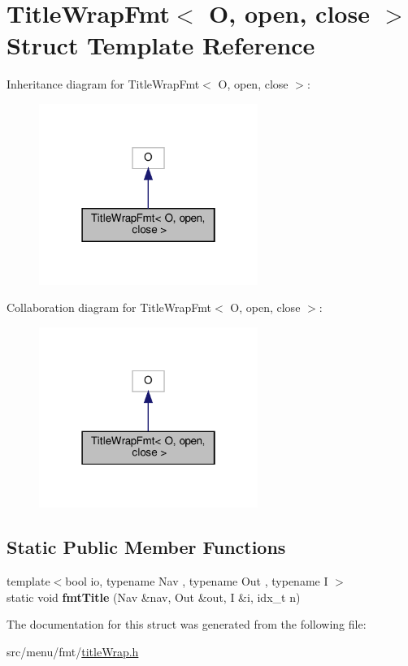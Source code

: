 \hypertarget{structTitleWrapFmt}{}\section{Title\+Wrap\+Fmt$<$ O, open, close $>$ Struct Template Reference}
\label{structTitleWrapFmt}


Inheritance diagram for Title\+Wrap\+Fmt$<$ O, open, close $>$\+:\nopagebreak
\begin{figure}[H]
\begin{center}
\leavevmode
\includegraphics[width=202pt]{structTitleWrapFmt__inherit__graph}
\end{center}
\end{figure}


Collaboration diagram for Title\+Wrap\+Fmt$<$ O, open, close $>$\+:\nopagebreak
\begin{figure}[H]
\begin{center}
\leavevmode
\includegraphics[width=202pt]{structTitleWrapFmt__coll__graph}
\end{center}
\end{figure}
\subsection*{Static Public Member Functions}
\begin{DoxyCompactItemize}
\item 
\mbox{\label{structTitleWrapFmt_acbe7b6d082c96e7af3492f275bb5c8c1}} 
{\footnotesize template$<$bool io, typename Nav , typename Out , typename I $>$ }\\static void {\bfseries fmt\+Title} (Nav \&nav, Out \&out, I \&i, idx\+\_\+t n)
\end{DoxyCompactItemize}


The documentation for this struct was generated from the following file\+:\begin{DoxyCompactItemize}
\item 
src/menu/fmt/\hyperlink{titleWrap_8h}{title\+Wrap.\+h}\end{DoxyCompactItemize}
